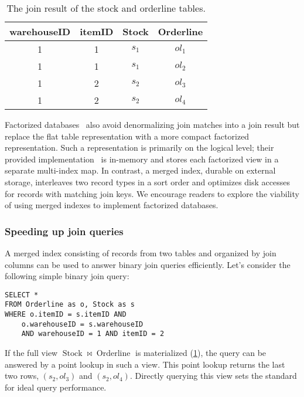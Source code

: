 \documentclass[biblatex, english]{lni}
\newcommand{\stockcell}{
    \cellcolor{blue}
}
\newcommand{\olcell}{
    \cellcolor{orange}
}
\DeclareMathOperator{\Orderline}{Orderline}
\DeclareMathOperator{\Stock}{Stock}
\DeclareMathOperator{\JOIN}{\bowtie}
\begin{document}
\begin{table}[!htb]
    \caption{The join result of the stock and orderline tables.}\label{tab:join}
    \centering
    \begin{tabular}{c c | c | c}
        \hline
        \textbf{warehouseID} & \textbf{itemID} & \textbf{Stock} & \textbf{Orderline} \\
        \hline
        1 & 1 & \stockcell \(s_1\) & \olcell \(ol_1\) \\
        1 & 1 & \stockcell \(s_1\) & \olcell \(ol_2\) \\
        1 & 2 & \stockcell \(s_2\) & \olcell \(ol_3\) \\
        1 & 2 & \stockcell \(s_2\) & \olcell \(ol_4\) \\
        \hline
    \end{tabular}
\end{table}

Factorized databases~\cite{factorizedDB} also avoid denormalizing join matches into a join result but replace the flat table representation with a more compact factorized representation.
Such a representation is primarily on the logical level; their provided implementation~\cite{f-ivm} is in-memory and stores each factorized view in a separate multi-index map.
In contrast, a merged index, durable on external storage, interleaves two record types in a sort order and optimizes disk accesses for records with matching join keys.
We encourage readers to explore the viability of using merged indexes to implement factorized databases.

\subsubsection{Speeding up join queries}

A merged index consisting of records from two tables and organized by join columns can be used to answer binary join queries efficiently.
Let's consider the following simple binary join query:

\begin{verbatim}
SELECT *
FROM Orderline as o, Stock as s
WHERE o.itemID = s.itemID AND
    o.warehouseID = s.warehouseID
    AND warehouseID = 1 AND itemID = 2
\end{verbatim}

If the full view \(\Stock \JOIN \Orderline\) is materialized (\cref{tab:join}), the query can be answered by a point lookup in such a view.
This point lookup returns the last two rows, \(\left(s_2, ol_3\right)\) and \(\left(s_2, ol_4\right)\).
Directly querying this view sets the standard for ideal query performance.
\end{document}

